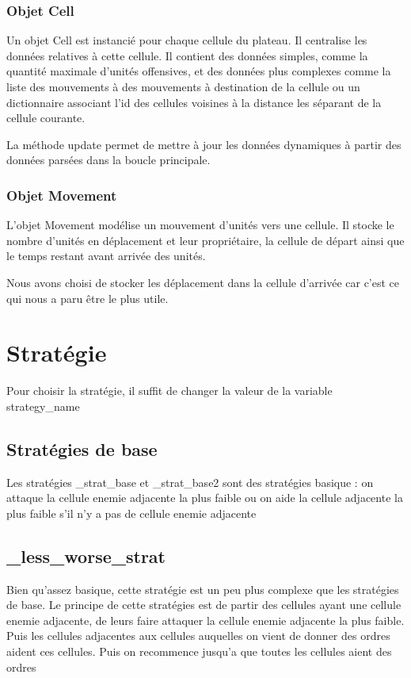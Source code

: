 \documentclass{rapport}
\begin{document}
			\subsection{Objet Cell}
Un objet Cell est instancié pour chaque cellule du plateau. Il centralise les
données relatives à cette cellule. Il contient des données simples, comme la
quantité maximale d'unités offensives, et des données plus complexes comme la
liste des mouvements à des mouvements à destination de la cellule ou un
dictionnaire associant l'id des cellules voisines à la distance les séparant de
la cellule courante.

La méthode update permet de mettre à jour les données dynamiques à partir des
données parsées dans la boucle principale.
			\subsection{Objet Movement}
L'objet Movement modélise un mouvement d'unités vers une cellule. Il stocke le
nombre d'unités en déplacement et leur propriétaire, la cellule de départ ainsi
que le temps restant avant arrivée des unités.

Nous avons choisi de stocker les déplacement dans la cellule d'arrivée car c'est
ce qui nous a paru être le plus utile.


	\chapter{Stratégie}
		Pour choisir la stratégie, il suffit de changer la valeur de la variable strategy\_name
		\section{Stratégies de base}
		Les stratégies \_strat\_base et \_strat\_base2 sont des stratégies basique : on attaque la cellule enemie adjacente la plus faible ou on aide la cellule adjacente la plus faible s'il n'y a pas de cellule enemie adjacente
		\section{\_less\_worse\_strat}
			Bien qu'assez basique, cette stratégie est un peu plus complexe que les stratégies de base.
			Le principe de cette stratégies est de partir des cellules ayant une cellule enemie adjacente, de leurs faire attaquer la cellule enemie adjacente la plus faible. Puis les cellules adjacentes aux cellules auquelles on vient de donner des ordres aident ces cellules.
			Puis on recommence jusqu'a que toutes les cellules aient des ordres
\end{document}
